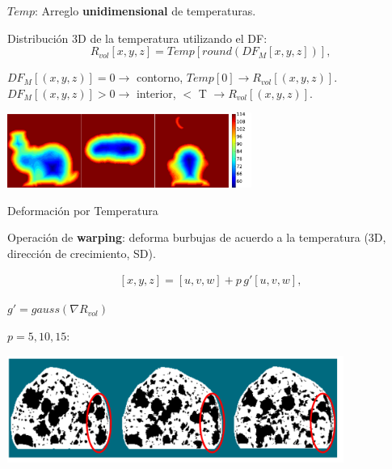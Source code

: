 \documentclass[spanish,unknownkeysallowed]{beamer}
\begin{document}
%


\begin{frame}

$Temp$: Arreglo \textbf{unidimensional} de temperaturas.


Distribución 3D de la temperatura utilizando el DF:
\begin{equation*}
\displaystyle R_{vol}[x,y,z] = Temp[ round( DF_{M}[x,y,z] ) ], 
\end{equation*}

$DF_{M}[(x,y,z)] = 0 \rightarrow$ contorno, $Temp[0] \rightarrow R_{vol}[(x,y,z)]$.
$DF_{M}[(x,y,z)] > 0 \rightarrow$ interior, $<$ T  $\rightarrow R_{vol}[(x,y,z)]$.

\centerline{\includegraphics[width=8cm]{../figures/tempsbunny}}
\end{frame}

\begin{frame}{Deformación por Temperatura}

Operación de \textbf{warping}: deforma burbujas de acuerdo a la temperatura (3D, dirección de crecimiento, SD).

\begin{align*}
\displaystyle
[x,y,z] = [u,v,w] + p\, g'[u,v,w],
\end{align*}

$g' = gauss(\nabla R_{vol})$

$p = 5,10,15$:
\centerline{\includegraphics[width=11cm]{../figures/parameterp}}

\end{frame}
\end{document}
